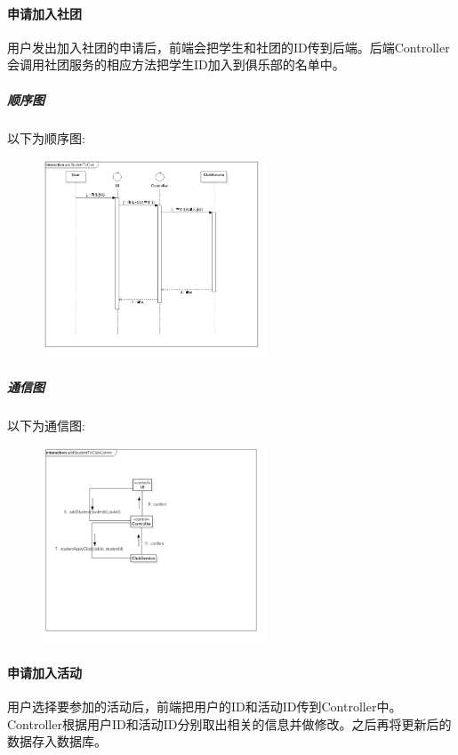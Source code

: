 \documentclass[UTF8]{ctexart}
\begin{document}
\paragraph{申请加入社团}
用户发出加入社团的申请后，前端会把学生和社团的ID传到后端。后端Controller会调用社团服务的相应方法把学生ID加入到俱乐部的名单中。

\subparagraph*{顺序图}
以下为顺序图:\\
\begin{figure}[H]
\centering
\includegraphics[width = 0.6\textwidth]{addStudentToClubSeq.jpg}
\end{figure}

\subparagraph*{通信图}
以下为通信图:\\
\begin{figure}[H]
\centering
\includegraphics[width = 0.6\textwidth]{addStudentToClubComm.jpg}
\end{figure}

\paragraph{申请加入活动}
用户选择要参加的活动后，前端把用户的ID和活动ID传到Controller中。Controller根据用户ID和活动ID分别取出相关的信息并做修改。之后再将更新后的数据存入数据库。
\end{document}

